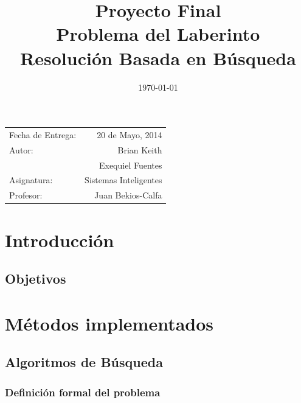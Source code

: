 \documentclass[letter, 10pt]{article}
\title{Proyecto Final \\ Problema del Laberinto \\ Resolución Basada en Búsqueda}
\date{\today}
\begin{document}
\maketitle %
\thispagestyle{fancy}

\begin{center}
\begin{tabular}{l r}
Fecha de Entrega: &  20 de Mayo, 2014 \\ %
Autor: & Brian Keith \\ & Exequiel Fuentes \\
Asignatura: & Sistemas Inteligentes\\ %
Profesor: & Juan Bekios-Calfa %
\end{tabular}
\end{center}



\section{Introducción}


\subsection{Objetivos}



\section{Métodos implementados}


\subsection{Algoritmos de Búsqueda}


\subsubsection{Definición formal del problema}
\end{document}
